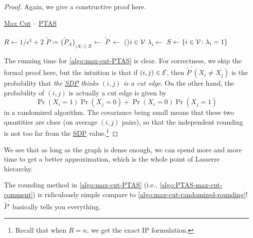 \begin{proof}
	Again, we give a constructive proof here.

	\begin{algorithm}[H]\label{algo:max-cut-PTAS}
		\DontPrintSemicolon
		\caption{\hyperref[prb:max-cut]{Max Cut} -- \href{https://en.wikipedia.org/wiki/Polynomial-time_approximation_scheme}{PTAS}}
		\BlankLine
		\(R\gets 1 / \epsilon ^4 + 2\)\;
		\(\widetilde{P} \coloneqq \{ \widetilde{P} _A \}_{\left\vert A \right\vert \leq R} \gets\)\;
		\(\widetilde{P} ^\prime \gets\)
		\;
		\label{algo:PTAS-max-cut-comment}
		\For(){\(i\in \mathcal{\MakeUppercase{v}} \)}{
			\(\lambda _i\gets\)\;
		}
		\(S\gets \left\{ i\in \mathcal{\MakeUppercase{v}} \colon \lambda _i = 1 \right\} \)\;
		\;
	\end{algorithm}

	The running time for \autoref{algo:max-cut-PTAS} is clear. For correctness, we skip the formal proof here, but the intuition is that if \((i, j)\in \mathcal{\MakeUppercase{e}} \), then \(\widetilde{P} ^\prime (X_i \neq X_j)\) is the probability that \emph{the \hyperref[def:SDP]{SDP} thinks \((i, j)\) is a cut edge}. On the other hand, the probability of \((i, j)\) is actually a cut edge is given by
	\[
		\Pr_{}(X_i = 1) \Pr_{}(X_j = 0) + \Pr_{}(X_i = 0) \Pr_{}(X_j = 1)
	\]
	in a randomized algorithm. The covariance being small means that these two quantities are close (on average \((i, j)\) pairs), so that the independent rounding is not too far from the \hyperref[def:SDP]{SDP} value.\footnote{Recall that when \(R=n\), we get the exact IP formulation.}
\end{proof}


We see that as long as the graph is dense enough, we can spend more and more time to get a better approximation, which is the whole point of Lasserre hierarchy.

\begin{remark}
	The rounding method in \autoref{algo:max-cut-PTAS} (i.e., \autoref{algo:PTAS-max-cut-comment}) is ridiculously simple compare to \autoref{algo:max-cut-randomized-rounding}! \(\widetilde{P} ^\prime \) basically tells you everything.
\end{remark}